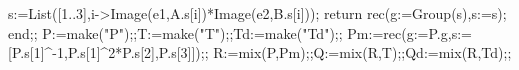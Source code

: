 \documentclass[
  10pt,
  letterpaper,
]{article}
\newenvironment{Shaded}{}{}
\newcommand{\BuiltInTok}[1]{\textcolor[rgb]{0.00,0.50,0.00}{#1}}
\newcommand{\ExtensionTok}[1]{#1}
\newcommand{\FloatTok}[1]{\textcolor[rgb]{0.25,0.63,0.44}{#1}}
\newcommand{\FunctionTok}[1]{\textcolor[rgb]{0.02,0.16,0.49}{#1}}
\newcommand{\NormalTok}[1]{#1}
\newcommand{\OperatorTok}[1]{\textcolor[rgb]{0.40,0.40,0.40}{#1}}
\newcommand{\StringTok}[1]{\textcolor[rgb]{0.25,0.44,0.63}{#1}}
\newcommand{\VariableTok}[1]{\textcolor[rgb]{0.10,0.09,0.49}{#1}}
\begin{document}
\begin{Shaded}
\begin{Highlighting}[]
 \VariableTok{s}\OperatorTok{:=}\BuiltInTok{List}\NormalTok{([}\FloatTok{1}\OperatorTok{..}\FloatTok{3}\NormalTok{]}\OperatorTok{,}\VariableTok{i}\OperatorTok{{-}\textgreater{}}\BuiltInTok{Image}\NormalTok{(}\VariableTok{e1}\OperatorTok{,}\VariableTok{A}\NormalTok{.}\VariableTok{s}\NormalTok{[}\VariableTok{i}\NormalTok{])}\OperatorTok{*}\BuiltInTok{Image}\NormalTok{(}\VariableTok{e2}\OperatorTok{,}\VariableTok{B}\NormalTok{.}\VariableTok{s}\NormalTok{[}\VariableTok{i}\NormalTok{]))}\OperatorTok{;}
 \ExtensionTok{return} \ExtensionTok{rec}\NormalTok{(}\VariableTok{g}\OperatorTok{:=}\BuiltInTok{Group}\NormalTok{(}\VariableTok{s}\NormalTok{)}\OperatorTok{,}\VariableTok{s}\OperatorTok{:=}\VariableTok{s}\NormalTok{)}\OperatorTok{;}
\FunctionTok{end}\OperatorTok{;;}
\VariableTok{P}\OperatorTok{:=}\VariableTok{make}\NormalTok{(}\StringTok{"P"}\NormalTok{)}\OperatorTok{;;}\VariableTok{T}\OperatorTok{:=}\VariableTok{make}\NormalTok{(}\StringTok{"T"}\NormalTok{)}\OperatorTok{;;}\VariableTok{Td}\OperatorTok{:=}\VariableTok{make}\NormalTok{(}\StringTok{"Td"}\NormalTok{)}\OperatorTok{;;}
\VariableTok{Pm}\OperatorTok{:=}\ExtensionTok{rec}\NormalTok{(}\VariableTok{g}\OperatorTok{:=}\VariableTok{P}\NormalTok{.}\VariableTok{g}\OperatorTok{,}\VariableTok{s}\OperatorTok{:=}\NormalTok{[}\VariableTok{P}\NormalTok{.}\VariableTok{s}\NormalTok{[}\FloatTok{1}\NormalTok{]}\OperatorTok{\^{}{-}}\FloatTok{1}\OperatorTok{,}\VariableTok{P}\NormalTok{.}\VariableTok{s}\NormalTok{[}\FloatTok{1}\NormalTok{]}\OperatorTok{\^{}}\FloatTok{2}\OperatorTok{*}\VariableTok{P}\NormalTok{.}\VariableTok{s}\NormalTok{[}\FloatTok{2}\NormalTok{]}\OperatorTok{,}\VariableTok{P}\NormalTok{.}\VariableTok{s}\NormalTok{[}\FloatTok{3}\NormalTok{]])}\OperatorTok{;;}
\VariableTok{R}\OperatorTok{:=}\VariableTok{mix}\NormalTok{(}\VariableTok{P}\OperatorTok{,}\VariableTok{Pm}\NormalTok{)}\OperatorTok{;;}\VariableTok{Q}\OperatorTok{:=}\VariableTok{mix}\NormalTok{(}\VariableTok{R}\OperatorTok{,}\VariableTok{T}\NormalTok{)}\OperatorTok{;;}\VariableTok{Qd}\OperatorTok{:=}\VariableTok{mix}\NormalTok{(}\VariableTok{R}\OperatorTok{,}\VariableTok{Td}\NormalTok{)}\OperatorTok{;;}

\end{Highlighting}
\end{Shaded}
\end{document}
